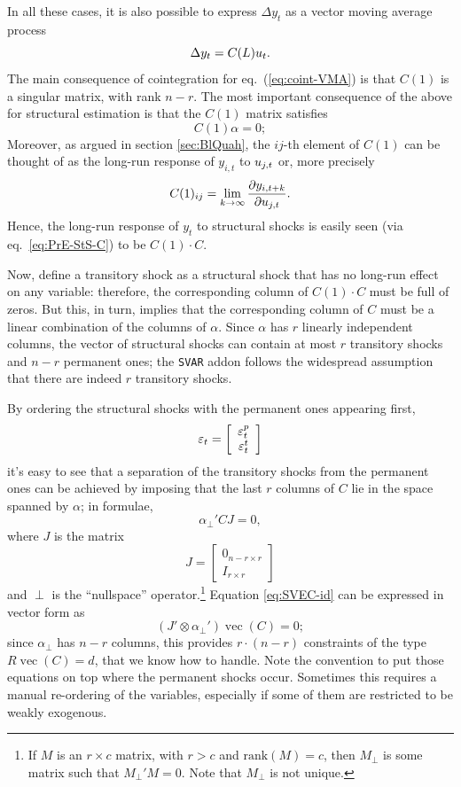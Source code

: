 \documentclass[a4paper,10pt]{article}
\newcommand{\PrE}[1]{\ensuremath u_{#1}} %
\newcommand{\StS}[1]{\ensuremath \varepsilon_{#1}} %
\newcommand{\pder}[2]{\ensuremath\frac{\partial #1}{\partial #2}}
\DeclareMathOperator{\VEC}{\mathrm{vec}}
\newcommand{\rk}[1]{\mathrm{rank}\left(#1\right)}
\begin{document}
In all these cases, it is also possible to express $\Delta y_{t}$ as a
vector moving average process
\begin{equation}
  \label{eq:coint-VMA}
  \Delta y_t = C(L) \PrE{t} .
\end{equation}
The main consequence of cointegration for eq.~(\ref{eq:coint-VMA}) is
that $C(1)$ is a singular matrix, with rank $n-r$.  The most important
consequence of the above for structural estimation is that the $C(1)$
matrix satisfies
\[
  C(1) \alpha = 0 ;
\]
Moreover, as argued in section \ref{sec:BlQuah}, the $ij$-th element
of $C(1)$ can be thought of as the long-run response of $y_{i,t}$ to
$\PrE{j,t}$ or, more precisely
\[
  C(1)_{ij} = \lim_{k \to \infty} \pder{y_{i, t+k}}{\PrE{j, t}}.
\]
Hence, the long-run response of $y_t$ to structural shocks is easily
seen (via eq.~\ref{eq:PrE-StS-C}) to be $C(1) \cdot C$.

Now, define a transitory shock as a structural shock that has no
long-run effect on any variable: therefore, the corresponding column
of $C(1) \cdot C$ must be full of zeros. But this, in turn, implies
that the corresponding column of $C$ must be a linear combination of
the columns of $\alpha$. Since $\alpha$ has $r$ linearly independent
columns, the vector of structural shocks can contain at most $r$ transitory
shocks and $n-r$ permanent ones; the \texttt{SVAR} addon follows the 
widespread assumption that there are indeed $r$ transitory shocks.

By ordering the structural shocks with the permanent ones appearing first,
\[
  \StS{t} = \left[ \begin{array}{c} \StS{t}^p \\ \StS{t}^t  \end{array}\right] 
\] 
it's easy to see that a separation of the transitory shocks from the
permanent ones can be achieved by imposing that the last $r$ columns
of $C$ lie in the space spanned by $\alpha$; in formulae,
\begin{equation}
  \label{eq:SVEC-id}
  \alpha_{\perp}' C J = 0 ,
\end{equation}
where $J$ is the matrix 
\[ 
  J = \left[ \begin{array}{c} 0_{n-r \times r} \\ 
      I_{r\times r}  \end{array}\right] 
\]
and $\perp$ is the ``nullspace'' operator.\footnote{If $M$ is an $r
  \times c$ matrix, with $r>c$ and $\rk{M} = c$, then $M_{\perp}$ is
  some matrix such that $M_{\perp}'M = 0$.  Note that $M_{\perp}$ is
  not unique.} Equation \eqref{eq:SVEC-id} can be expressed in vector
form as
\[
  ( J' \otimes \alpha_{\perp}' ) \VEC(C)  = 0 ;
\]
since $\alpha_{\perp}$ has $n-r$ columns, this provides $r\cdot(n-r)$
constraints of the type $R \VEC(C) = d$, that we know how to handle.
Note the convention to put those equations on top where the permanent 
shocks occur. Sometimes this requires a manual re-ordering of the variables, 
especially if some of them are restricted to be weakly exogenous.
\end{document}
